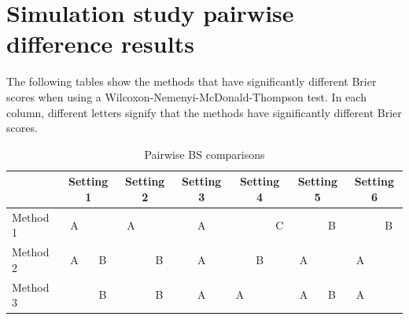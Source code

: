 \documentclass[11pt]{article}
\begin{document}
\appendix

\section{Simulation study pairwise difference results} \label{rba:pdiffs}
The following tables show the methods that have significantly different Brier scores when using a Wilcoxon-Nemenyi-McDonald-Thompson test.
In each column, different letters signify that the methods have significantly different Brier scores.

\begin{table}[htbp]
  \centering
  \caption{Pairwise BS comparisons}
  \label{rbtbl:pwbssim}
  \begin{tabular}{|l|cc|cc|c|ccc|cc|cc|}
  \cline{2-13}
  \multicolumn{1}{c}{} & \multicolumn{2}{|c}{Setting 1} & \multicolumn{2}{|c}{Setting 2} & \multicolumn{1}{|c}{Setting 3} & \multicolumn{3}{|c}{Setting 4} & \multicolumn{2}{|c}{Setting 5} & \multicolumn{2}{|c|}{Setting 6}\\
  \hline
  Method 1 & A &   & A &   & A &   &   & C &   & B &   & B \\
  \hline
  Method 2 & A & B &   & B & A &   & B &   & A &   & A &   \\
  \hline
  Method 3 &   & B &   & B & A & A &   &   & A & B & A &   \\
  \hline
  \end{tabular}
\end{table}



\begin{singlespace}


\end{singlespace}
\end{document}
